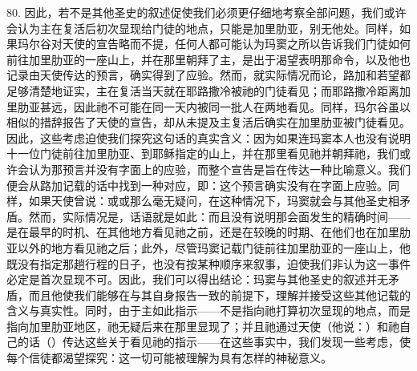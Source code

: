 80. 因此，若不是其他圣史的叙述促使我们必须更仔细地考察全部问题，我们或许会认为主在复活后初次显现给门徒的地点，只能是加里肋亚，别无他处。同样，如果玛尔谷对天使的宣告略而不提，任何人都可能认为玛窦之所以告诉我们门徒如何前往加里肋亚的一座山上，并在那里朝拜了主，是出于渴望表明那命令，以及他也记录由天使传达的预言，确实得到了应验。然而，就实际情况而论，路加和若望都足够清楚地证实，主在复活当天就在耶路撒冷被祂的门徒看见；而耶路撒冷距离加里肋亚甚远，因此祂不可能在同一天内被同一批人在两地看见。同样，玛尔谷虽以相似的措辞报告了天使的宣告，却从未提及主复活后确实在加里肋亚被门徒看见。因此，这些考虑迫使我们探究这句话的真实含义：因为如果连玛窦本人也没有说明十一位门徒前往加里肋亚、到耶稣指定的山上，并在那里看见祂并朝拜祂，我们或许会认为那预言并没有字面上的应验，而整个宣告是旨在传达一种比喻意义。我们便会从路加记载的话中找到一种对应，即：这个预言确实没有在字面上应验。同样，如果天使曾说：或或那么毫无疑问，在这种情况下，玛窦就会与其他圣史相矛盾。然而，实际情况是，话语就是如此：而且没有说明那会面发生的精确时间——是在最早的时机、在其他地方看见祂之前，还是在较晚的时期、在他们也在加里肋亚以外的地方看见祂之后；此外，尽管玛窦记载门徒前往加里肋亚的一座山上，他既没有指定那趟行程的日子，也没有按某种顺序来叙事，迫使我们非认为这一事件必定是首次显现不可。因此，我们可以得出结论：玛窦与其他圣史的叙述并无矛盾，而且他使我们能够在与其自身报告一致的前提下，理解并接受这些其他记载的含义与真实性。同时，由于主如此指示——不是指向祂打算初次显现的地点，而是指向加里肋亚地区，祂无疑后来在那里显现了；并且祂通过天使（他说：）和祂自己的话（）传达这些关于看见祂的指示——在这些事实中，我们发现一些考虑，使每个信徒都渴望探究：这一切可能被理解为具有怎样的神秘意义。\par

